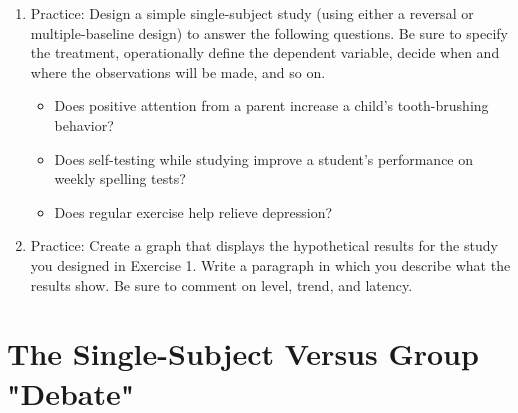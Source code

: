 \begin{fullwidth}
 
\begin{enumerate}
 
\item  Practice: Design a simple single-subject study (using either a reversal or multiple-baseline design) to answer the following questions. Be sure to specify the treatment, operationally define the dependent variable, decide when and where the observations will be made, and so on.
 
 \begin{itemize}
 
 \item Does positive attention from a parent increase a child's tooth-brushing behavior?
 
  
\item Does self-testing while studying improve a student's performance on weekly spelling
tests?
 
  
\item Does regular exercise help relieve depression?
 
 \end{itemize}
 
 
\item Practice: Create a graph that displays the hypothetical results for the study you designed in Exercise 1. Write a paragraph in which you describe what the results show. Be sure to comment on level, trend, and latency.

 
\end{enumerate}
 
\end{fullwidth}  
 
 \newpage
   \section{The Single-Subject Versus Group "Debate"}
   
  
